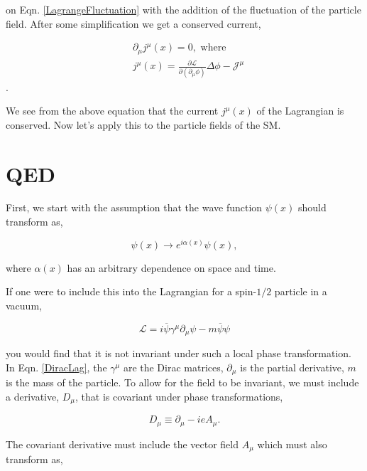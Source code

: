  on Eqn. \ref{LagrangeFluctuation} with the addition of the fluctuation of the particle field. After some simplification we get a conserved current,
 
 \begin{equation}
 \begin{split}
 & \partial_\mu j^\mu(x)=0, \text{ where}\\
 & j^\mu(x)=\frac{\partial\mathcal{L}}{\partial(\partial_\mu\phi)}\Delta\phi-\mathcal{J}^\mu
 \end{split}
 \end{equation}.
 
 We see from the above equation that the current $j^\mu(x)$ of the Lagrangian is conserved. Now let's apply this to the particle fields of the SM.
 
 \section{QED}
 
 First, we start with the assumption that the wave function $\psi(x)$ should transform as,
 
 \begin{equation}\label{U1gauge}
 \psi(x)\rightarrow e^{i\alpha(x)}\psi(x),
 \end{equation}
 
 where $\alpha(x)$ has an arbitrary dependence on space and time. 
 
If one were to include this into the Lagrangian for a spin-$1/2$ particle in a vacuum,
 
\begin{equation}\label{DiracLag}
\mathcal{L}=i\overline{\psi}\gamma^\mu\partial_\mu\psi-m\overline{\psi}\psi
\end{equation}
 
you would find that it is not invariant under such a local phase transformation. In Eqn. \ref{DiracLag}, the $\gamma^\mu$ are the Dirac matrices, $\partial_\mu$ is the partial derivative, $m$ is the mass of the particle. To allow for the field to be invariant, we must include a derivative, $D_\mu$, that is covariant under phase transformations,
 
 \begin{equation}\label{QEDCovariantD}
 D_\mu\equiv\partial_\mu-ieA_\mu.
 \end{equation}
 
 The covariant derivative must include the vector field $A_\mu$ which must also transform as,
  
